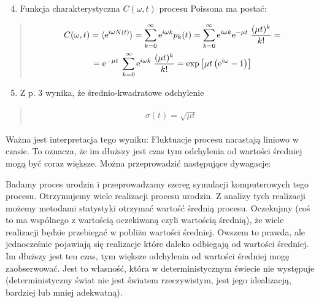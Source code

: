 \documentclass[a4paper,12pt,polish]{sphinxmanual}
\begin{document}
\begin{enumerate}
\setcounter{enumi}{3}
\item {} 
Funkcja charakterystyczna $C(\omega, t)$ procesu Poissona ma postać:

\end{enumerate}
\begin{quote}
\label{ch3/chIII021:equation-eqn29}\begin{gather}
\begin{split}C(\omega, t) = \langle \mbox{e}^{i\omega N(t)} \rangle = \sum_{k=0}^{\infty} \mbox{e}^{i\omega k} p_k(t) = \sum_{k=0}^{\infty} \mbox{e}^{i\omega k} \mbox{e}^{-\mu t} \; \frac{(\mu t)^k}{k!} =\end{split}\label{ch3/chIII021-eqn29}\\\begin{split}= \mbox{e}^{-\mu t} \; \sum_{k=0}^{\infty} \mbox{e}^{i\omega k} \; \frac{(\mu t)^k}{k!} = \mbox{exp}\left[\mu t \left(\mbox{e}^{i\omega} -1\right)\right]\end{split}\notag
\end{gather}\end{quote}
\begin{enumerate}
\setcounter{enumi}{4}
\item {} 
Z p. 3 wynika, że średnio-kwadratowe odchylenie

\end{enumerate}
\begin{quote}
\label{ch3/chIII021:equation-eqn30}\begin{gather}
\begin{split}\sigma(t) = \sqrt{\mu t} \;\end{split}\label{ch3/chIII021-eqn30}
\end{gather}\end{quote}

Ważna jest interpretacja tego wyniku: Fluktuacje procesu narastają liniowo w czasie. To oznacza, że im dłuższy jest czas tym odchylenia od wartości średniej mogą być coraz większe. Można przeprowadzić następujące dywagacje:

Badamy proces urodzin i przeprowadzamy szereg symulacji komputerowych tego procesu. Otrzymujemy wiele realizacji procesu urodzin. Z analizy tych realizacji możemy metodami statystyki otrzymać wartość średnią procesu. Oczekujmy (coś to ma wspólnego z wartością oczekiwaną czyli wartością średnią), że wiele realizacji będzie przebiegać w pobliżu wartości średniej. Owszem to prawda, ale jednocześnie pojawiają się realizacje które daleko odbiegają od wartości średniej. Im dłuższy jest ten czas, tym większe odchylenia od wartości średniej mogę zaobserwować. Jest to własność, która w deterministycznym świecie nie występuje (deterministyczny świat nie jest światem rzeczywistym, jest jego idealizacją, bardziej lub mniej adekwatną).
\end{document}

